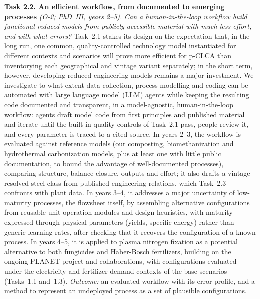 \documentclass[compact]{nserc} %
\begin{document}
\noindent \textbf{Task 2.2. An efficient workflow, from documented to emerging processes} \emph{(O-2; PhD~III, years 2--5).} \emph{Can a human-in-the-loop workflow build functional reduced models from publicly accessible material with much less effort, and with what errors? }%
%
Task~2.1 stakes its design on the expectation that, in the long run, one common, quality-controlled technology model instantiated for different contexts and scenarios will prove more efficient for p-CLCA than inventorying each geographical and vintage variant separately; in the short term, however, developing reduced engineering models remains a major investment. We investigate to what extent data collection, process modelling and coding can be automated with large language model (LLM) agents while keeping the resulting code documented and transparent, in a model-agnostic, human-in-the-loop workflow: agents draft model code from first principles and published material and iterate until the built-in quality controls of Task~2.1 pass, people review it, and every parameter is traced to a cited source. In years 2--3, the workflow is evaluated against reference models (our composting, biomethanization and hydrothermal carbonization models, plus at least one with little public documentation, to bound the advantage of well-documented processes), comparing structure, balance closure, outputs and effort; it also drafts a vintage-resolved steel class from published engineering relations, which Task~2.3 confronts with plant data. In years 3--4, it addresses a major uncertainty of low-maturity processes, the flowsheet itself, by assembling alternative configurations from reusable unit-operation modules and design heuristics, with maturity expressed through physical parameters (yields, specific energy) rather than generic learning rates, after checking that it recovers the configuration of a known process. In years 4--5, it is applied to plasma nitrogen fixation as a potential alternative to both fungicides and Haber-Bosch fertilizers, building on the ongoing PLANET project and collaborations, with configurations evaluated under the electricity and fertilizer-demand contexts of the base scenarios (Tasks~1.1 and~1.3). \emph{Outcome:} an evaluated workflow with its error profile, and a method to represent an undeployed process as a set of plausible configurations.
\end{document}
